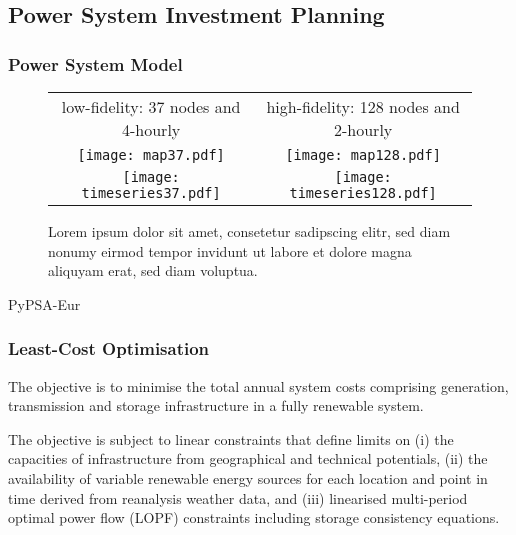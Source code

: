 \subsection{Power System Investment Planning}
\label{sec:model}

\subsubsection{Power System Model}


\begin{SCfigure}
    \begin{tabular}{cc}
        \footnotesize low-fidelity: 37 nodes and 4-hourly & \footnotesize high-fidelity: 128 nodes and 2-hourly \\
        \texttt{[image: map37.pdf]} &
        \texttt{[image: map128.pdf]} \\
        \texttt{[image: timeseries37.pdf]} &
        \texttt{[image: timeseries128.pdf]} \\
    \end{tabular}
    \caption{Lorem ipsum dolor sit amet, consetetur sadipscing elitr, sed diam nonumy eirmod tempor invidunt ut labore et dolore magna aliquyam erat, sed diam voluptua.}
\end{SCfigure}

PyPSA-Eur \cite{pypsa} \cite{pypsaeur} \cite{hoersch_spatial_2017} \cite{snakemake}


\subsubsection{Least-Cost Optimisation}

The objective is to minimise the total annual system costs comprising generation, transmission and storage infrastructure in a fully renewable system.

The objective is subject to linear constraints that define limits on (i) the capacities of infrastructure from geographical and technical potentials, (ii) the availability of variable renewable energy sources for each location and point in time derived from reanalysis weather data, and (iii) linearised multi-period optimal power flow (LOPF) constraints including storage consistency equations.



